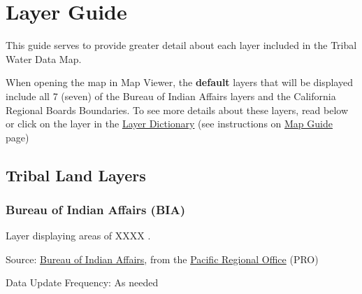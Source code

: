 \documentclass[
  letterpaper,
  DIV=11,
  numbers=noendperiod]{scrreprt}
\begin{document}

\chapter{Layer Guide}\label{layer-guide}

This guide serves to provide greater detail about each layer included in
the Tribal Water Data Map.

\begin{tcolorbox}[enhanced jigsaw, colframe=quarto-callout-note-color-frame, bottomtitle=1mm, opacitybacktitle=0.6, breakable, bottomrule=.15mm, opacityback=0, colback=white, left=2mm, leftrule=.75mm, coltitle=black, rightrule=.15mm, toprule=.15mm, titlerule=0mm, toptitle=1mm, arc=.35mm, title=\textcolor{quarto-callout-note-color}{\faInfo}\hspace{0.5em}{Note on default map settings}, colbacktitle=quarto-callout-note-color!10!white]

When opening the map in Map Viewer, the \textbf{default} layers that
will be displayed include all 7 (seven) of the Bureau of Indian Affairs
layers and the California Regional Boards Boundaries. To see more
details about these layers, read below or click on the layer in the
\href{https://gispublic.waterboards.ca.gov/portal/home/item.html?id=16e2736dbf924effbbab3c771bf569fd}{Layer
Dictionary} (see instructions on
\href{https://cawaterboarddatacenter.github.io/tribal-water-data-map-manual/map-guide.html}{Map
Guide} page)

\end{tcolorbox}

\section{Tribal Land Layers}\label{tribal-land-layers}

\subsection{Bureau of Indian Affairs
(BIA)}\label{bureau-of-indian-affairs-bia}

Layer displaying areas of XXXX .

Source:
\href{https://www.bia.gov/sites/default/files/dup/assets/bia/pacreg/PRO_Indian_Lands.gdb_.zip}{Bureau
of Indian Affairs}, from the
\href{https://www.bia.gov/regional-offices/pacific}{Pacific Regional
Office} (PRO)

Data Update Frequency: As needed
\end{document}
